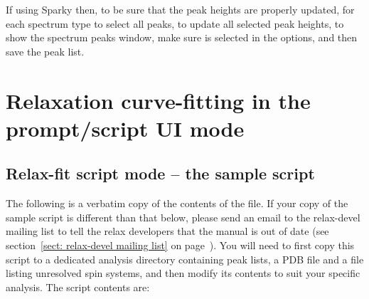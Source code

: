 If using Sparky then, to be sure that the peak heights are properly updated, for each spectrum type  to select all peaks,  to update all selected peak heights,  to show the spectrum peaks window, make sure  is selected in the options, and then save the peak list.



\section{Relaxation curve-fitting in the prompt/script UI mode}



\subsection{Relax-fit script mode -- the sample script}

The following is a verbatim copy of the contents of the  file.
If your copy of the sample script is different than that below, please send an email to the relax-devel mailing list to tell the relax developers that the manual is out of date (see section~\ref{sect: relax-devel mailing list} on page~\pageref{sect: relax-devel mailing list}).
You will need to first copy this script to a dedicated analysis directory containing peak lists, a PDB file and a file listing unresolved spin systems, and then modify its contents to suit your specific analysis.
The script contents are:

